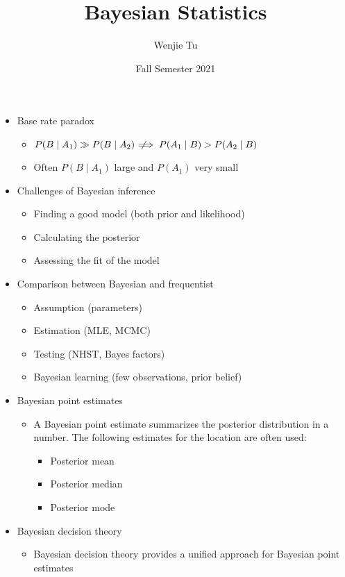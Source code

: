 \documentclass[a4paper]{article}
\title{%
    Bayesian Statistics
}
\author{Wenjie Tu}
\date{Fall Semester 2021}
\newcommand{\notimplies}{\;\not\!\!\!\implies}
\begin{document}
\maketitle

\begin{itemize}
    \item Base rate paradox
    \begin{itemize}
        \item $P(B\mid A_1)\gg P(B\mid A_2) \notimplies P(A_1\mid B)>P(A_2\mid B)$ 
        \item Often $P(B\mid A_1)$ large and $P(A_1)$ very small
    \end{itemize}
    \item Challenges of Bayesian inference
    \begin{itemize}
        \item Finding a good model (both prior and likelihood)
        \item Calculating the posterior
        \item Assessing the fit of the model
    \end{itemize}
    \item Comparison between Bayesian and frequentist
    \begin{itemize}
        \item Assumption (parameters)
        \item Estimation (MLE, MCMC)
        \item Testing (NHST, Bayes factors)
        \item Bayesian learning (few observations, prior belief)
    \end{itemize}
    \item Bayesian point estimates
    \begin{itemize}
        \item A Bayesian point estimate summarizes the posterior distribution in a number. The following estimates for the location are often used:
        \begin{itemize}
            \item Posterior mean
            \item Posterior median
            \item Posterior mode
        \end{itemize}
    \end{itemize}
    \item Bayesian decision theory
    \begin{itemize}
        \item Bayesian decision theory provides a unified approach for Bayesian point estimates

\end{itemize}
\end{itemize}
\end{document}
